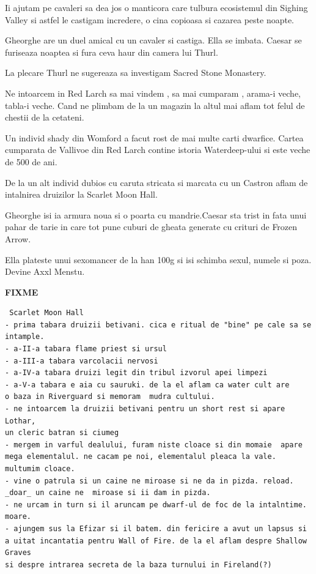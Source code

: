 \documentclass[12pt,oneside]{book}
\begin{document}
Ii ajutam pe cavaleri sa dea jos o manticora care tulbura ecosistemul din Sighing Valley si 
astfel le castigam incredere, o cina copioasa si cazarea peste noapte.

Gheorghe are un duel amical cu un cavaler si castiga. Ella se imbata. Caesar se furiseaza
noaptea si fura ceva haur din camera lui Thurl.

La plecare Thurl ne sugereaza sa investigam Sacred Stone Monastery.

Ne intoarcem in Red Larch sa mai vindem , sa mai cumparam , arama-i veche, tabla-i veche.
Cand ne plimbam de la un magazin la altul mai aflam tot felul de chestii de la cetateni.

Un individ shady din Womford a facut rost de mai multe carti dwarfice. Cartea
cumparata de Vallivoe din Red Larch contine istoria Waterdeep-ului si este veche 
de 500 de ani.

De la un alt individ dubios cu caruta stricata si marcata cu un Castron aflam de intalnirea 
druizilor la Scarlet Moon Hall.

Gheorghe isi ia armura noua si o poarta cu mandrie.Caesar sta trist in fata unui pahar de tarie in  care tot pune cuburi de gheata generate cu crituri de Frozen Arrow.

Ella plateste unui sexomancer de la han 100g si isi schimba sexul, numele si poza. Devine Axxl Menstu.



\textbf{FIXME}
\begin{verbatim}
 Scarlet Moon Hall
- prima tabara druizii betivani. cica e ritual de "bine" pe cale sa se intample.
- a-II-a tabara flame priest si ursul
- a-III-a tabara varcolacii nervosi
- a-IV-a tabara druizi legit din tribul izvorul apei limpezi
- a-V-a tabara e aia cu sauruki. de la el aflam ca water cult are 
o baza in Riverguard si memoram  mudra cultului. 
- ne intoarcem la druizii betivani pentru un short rest si apare Lothar, 
un cleric batran si ciumeg
- mergem in varful dealului, furam niste cloace si din momaie  apare 
mega elementalul. ne cacam pe noi, elementalul pleaca la vale. multumim cloace.
- vine o patrula si un caine ne miroase si ne da in pizda. reload. 
_doar_ un caine ne  miroase si ii dam in pizda.
- ne urcam in turn si il aruncam pe dwarf-ul de foc de la intalntime. moare.
- ajungem sus la Efizar si il batem. din fericire a avut un lapsus si 
a uitat incantatia pentru Wall of Fire. de la el aflam despre Shallow Graves 
si despre intrarea secreta de la baza turnului in Fireland(?)
\end{verbatim}
\end{document}
